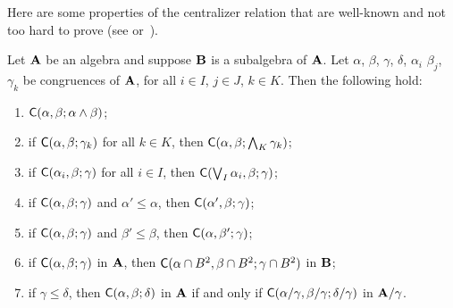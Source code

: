 


Here are some properties of the centralizer relation
that are well-known and not too hard to prove
(see \cite[Prop~3.4]{HM:1988} or~\cite[Thm~2.19]{MR3076179}).
\begin{lem}
\label{lem:centralizers}
Let $\mathbf{A}$ be an algebra and suppose
$\mathbf{B}$ is a subalgebra of $\mathbf{A}$. 
Let $\alpha$, $\beta$, $\gamma$, $\delta$, $\alpha_i$
$\beta_j$, $\gamma_k$
be congruences of $\mathbf{A}$, for all 
$i \in I$, $j\in J$, $k \in K$. Then the following hold:
\begin{enumerate}
\item \label{centralizing_over_meet}
  $\mathsf{C}(\alpha, \beta; \alpha \wedge \beta)$;
\item \label{centralizing_over_meet2}
  if $\mathsf{C}(\alpha,  \beta;  \gamma_k)$ for all $k \in K$, then
  $\mathsf{C}(\alpha,  \beta;  \bigwedge_{K}\gamma_k)$;
\item \label{centralizing_over_join1}
  if $\mathsf{C}(\alpha_i,  \beta;  \gamma)$ for all $i\in I$, then
  $\mathsf{C}(\bigvee_{I}\alpha_i,  \beta; \gamma)$;
\item \label{monotone_centralizers1}
  if $\mathsf{C}(\alpha,  \beta;  \gamma)$ and $\alpha' \leq \alpha$, then 
  $\mathsf{C}(\alpha',  \beta;  \gamma)$;
\item \label{monotone_centralizers2}
  if $\mathsf{C}(\alpha,  \beta;  \gamma)$ and $\beta' \leq \beta$, then
  $\mathsf{C}(\alpha,  \beta';  \gamma)$;
\item \label{centralizing_over_subalg}
  if $\mathsf{C}(\alpha,  \beta;  \gamma)$ in $\mathbf{A}$, 
  then $\mathsf{C}(\alpha\cap B^2,  \beta\cap B^2; \gamma\cap B^2)$ in $\mathbf{B}$;
\item \label{centralizing_factors}
  if $\gamma \leq \delta$, then $\mathsf{C}(\alpha,  \beta;  \delta)$
  in $\mathbf{A}$ if and only if $\mathsf{C}(\alpha/\gamma,  \beta/\gamma;  \delta/\gamma)$
  in $\mathbf{A}/\gamma$.
\end{enumerate}
\end{lem}


